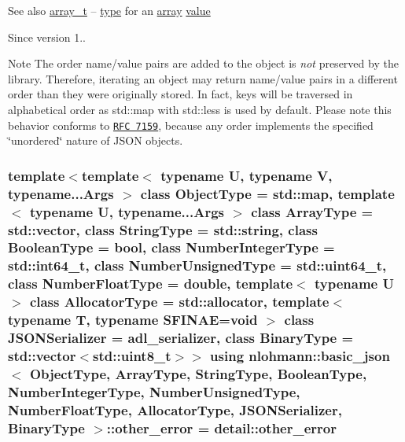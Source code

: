 \begin{DoxySeeAlso}{See also}
\hyperlink{classnlohmann_1_1basic__json_a53700c308d804f84aea5ff05abb2ac4e}{array\+\_\+t} -- \hyperlink{classnlohmann_1_1basic__json_a5b7c4b35a0ad9f97474912a08965d7ad}{type} for an \hyperlink{classnlohmann_1_1basic__json_ad2b075c694e4564c9742d2c8db7c7c5f}{array} \hyperlink{classnlohmann_1_1basic__json_ac9e014095170d72c4c57e3daf8efc059}{value}
\end{DoxySeeAlso}
\begin{DoxySince}{Since}
version 1..
\end{DoxySince}
\begin{DoxyNote}{Note}
The order name/value pairs are added to the object is {\itshape not} preserved by the library. Therefore, iterating an object may return name/value pairs in a different order than they were originally stored. In fact, keys will be traversed in alphabetical order as {\ttfamily std\+::map} with {\ttfamily std\+::less} is used by default. Please note this behavior conforms to \href{http://rfc7159.net/rfc7159}{\tt R\+FC 7159}, because any order implements the specified \char`\"{}unordered\char`\"{} nature of J\+S\+ON objects. 
\end{DoxyNote}
\subsubsection[{\texorpdfstring{other\+\_\+error}{other_error}}]{\setlength{\rightskip}{0pt plus 5cm}template$<$template$<$ typename U, typename V, typename...\+Args $>$ class Object\+Type = std\+::map, template$<$ typename U, typename...\+Args $>$ class Array\+Type = std\+::vector, class String\+Type  = std\+::string, class Boolean\+Type  = bool, class Number\+Integer\+Type  = std\+::int64\+\_\+t, class Number\+Unsigned\+Type  = std\+::uint64\+\_\+t, class Number\+Float\+Type  = double, template$<$ typename U $>$ class Allocator\+Type = std\+::allocator, template$<$ typename T, typename S\+F\+I\+N\+A\+E=void $>$ class J\+S\+O\+N\+Serializer = adl\+\_\+serializer, class Binary\+Type  = std\+::vector$<$std\+::uint8\+\_\+t$>$$>$ using {\bf nlohmann\+::basic\+\_\+json}$<$ Object\+Type, Array\+Type, String\+Type, Boolean\+Type, Number\+Integer\+Type, Number\+Unsigned\+Type, Number\+Float\+Type, Allocator\+Type, J\+S\+O\+N\+Serializer, Binary\+Type $>$\+::{\bf other\+\_\+error} =  {\bf detail\+::other\+\_\+error}}\hypertarget{classnlohmann_1_1basic__json_a6fc373c99facc37aadbc5651b3d6631d}{}\label{classnlohmann_1_1basic__json_a6fc373c99facc37aadbc5651b3d6631d}


